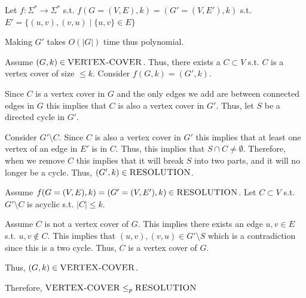 \documentclass[12pt, letterpaper]{article}
\begin{document}
\begin{problemproof}
   Let $f: \Sigma^* \to \Sigma^*$ s.t. $f(G=(V,E),k)=(G'=(V,E'),k)$ s.t. $E'=\{(u,v),(v,u) \mid \{u,v\} \in E\}$ 

   Making $G'$ takes $O(|G|)$ time thus polynomial.

   Assume $(G,k) \in \textsc{VERTEX-COVER}$. Thus, there exists a $C \subset V$ s.t. $C$ is a vertex cover of size $\leq k$. Consider $f(G,k)=(G',k)$.

   Since $C$ is a vertex cover in $G$ and the only edges we add are between connected edges in $G$ this implies that $C$ is also a vertex cover in $G'$. Thus, let $S$ be a directed cycle in $G'$.

   Consider $G'\setminus C$. Since $C$ is also a vertex cover in $G'$ this implies that at least one vertex of an edge in $E'$ is in $C$. Thus, this implies that $S \cap C \neq \emptyset$. Therefore, when we remove $C$ this implies that it will break $S$ into two parts, and it will no longer be a cycle. Thus, $(G',k) \in \textsc{RESOLUTION}$.

   Assume $f(G=(V,E),k)=(G'=(V,E'),k) \in \textsc{RESOLUTION}$. Let $C \subset V$ s.t. $G'\setminus C$ is acyclic s.t. $|C| \leq k$.

   Assume $C$ is not a vertex cover of $G$. This implies there exists an edge ${u,v} \in E$ s.t. $u,v \notin C$. This implies that $(u,v),(v,u) \in G' \setminus S$ which is a contradiction since this is a two cycle. Thus, $C$ is a vertex cover of $G$.

   Thus, $(G,k) \in \textsc{VERTEX-COVER}$.

   Therefore, $\textsc{VERTEX-COVER} \leq_p \textsc{RESOLUTION}$
\end{problemproof}
\end{document}
